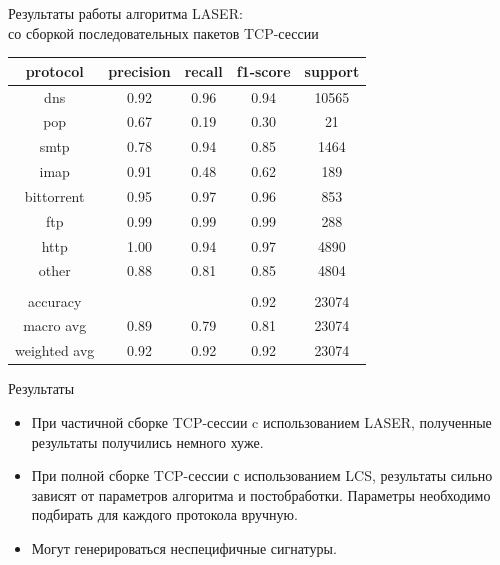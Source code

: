 \documentclass[10pt]{beamer}
\begin{document}
\begin{frame}{Результаты работы алгоритма LASER: \\ со сборкой последовательных пакетов TCP-сессии}
    \begin{table}[]
        \begin{tabular}{|c|c|c|c|c|}
        \hline
        protocol     & precision & recall & f1-score & support \\ \hline
        dns          & 0.92      & 0.96   & 0.94     & 10565   \\ \hline
        pop          & 0.67      & 0.19   & 0.30     &    21   \\ \hline
        smtp         & 0.78      & 0.94   & 0.85     &  1464   \\ \hline
        imap         & 0.91      & 0.48   & 0.62     &   189   \\ \hline
        bittorrent   & 0.95      & 0.97   & 0.96     &   853   \\ \hline
        ftp          & 0.99      & 0.99   & 0.99     &   288   \\ \hline
        http         & 1.00      & 0.94   & 0.97     &  4890   \\ \hline
        other        & 0.88      & 0.81   & 0.85     &  4804   \\ \hline
                     &           &        &          &         \\ \hline
        accuracy     &           &        & 0.92     & 23074   \\ \hline
        macro avg    & 0.89      & 0.79   & 0.81     & 23074   \\ \hline
        weighted avg & 0.92      & 0.92   & 0.92     & 23074   \\ \hline

        \end{tabular}
    \end{table}
\end{frame}

\begin{frame}{Результаты}
    \begin{itemize}
        \item При частичной сборке TCP-сессии c использованием LASER, полученные результаты получились немного хуже.
        \item При полной сборке TCP-сессии с использованием LCS, результаты сильно зависят от параметров алгоритма и постобработки. Параметры необходимо подбирать для каждого протокола вручную.
        \item Могут генерироваться неспецифичные сигнатуры.
    \end{itemize}
\end{frame}
\end{document}
